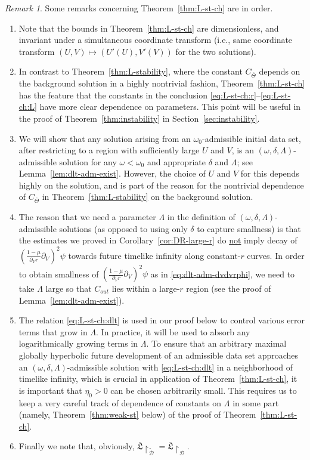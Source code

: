 \documentclass[10pt, reqno]{amsart}
\theoremstyle{definition}
\theoremstyle{remark}
\newtheorem{remark}[theorem]{Remark}
\theoremstyle{conjecture}
\numberwithin{equation}{section}
\newcommand{\rd}{\partial}
\newcommand{\0}{\emptyset}
\newcommand{\dlt}{\delta}
\newcommand{\Lmb}{\Lambda}
\newcommand{\Tht}{\Theta}
\newcommand{\omg}{\omega}
\newcommand{\calD}{\mathcal D}
\newcommand{\f}{\frac}
\begin{document}
\begin{remark} \label{rem:L-stability-char}
Some remarks concerning Theorem~\ref{thm:L-st-ch} are in order.
\begin{enumerate}
\item Note that the bounds in Theorem~\ref{thm:L-st-ch} are dimensionless, and invariant under a simultaneous coordinate transform (i.e., same coordinate transform $(U, V) \mapsto (U'(U), V'(V))$ for the two solutions).
\item In contrast to Theorem~\ref{thm:L-stability}, where the constant $C_{\overline{\Tht}}$ depends on the background solution in a highly nontrivial fashion, Theorem~\ref{thm:L-st-ch} has the feature that the constants in the conclusion \eqref{eq:L-st-ch:r}--\eqref{eq:L-st-ch:L} have more clear dependence on parameters. This point will be useful in the proof of Theorem~\ref{thm:instability} in Section~\ref{sec:instability}.
\item We will show that any solution arising from an $\omg_0$-admissible initial data set, after restricting to a region with sufficiently large $U$ and $V$, is an $(\omg, \dlt, \Lmb)$-admissible solution for any $\omg<\omg_0$ and appropriate $\dlt$ and $\Lmb$; see Lemma~\ref{lem:dlt-adm-exist}. However, the choice of $U$ and $V$ for this depends highly on the solution, and is part of the reason for the nontrivial dependence of $C_{\overline{\Tht}}$ in Theorem~\ref{thm:L-stability} on the background solution.

\item The reason that we need a parameter $\Lmb$ in the definition of $(\omg, \dlt, \Lmb)$-admissible solutions (as opposed to using only $\dlt$ to capture smallness) is that the estimates we proved in Corollary~\ref{cor:DR-large-r} do \underline{not} imply decay of $\left(\f{1-\mu}{\rd_V r} \rd_V\right)^2 \psi$ towards future timelike infinity along constant-$r$ curves. In order to obtain smallness of $\left(\f{1-\mu}{\rd_V r} \rd_V\right)^2 \psi$ as in \eqref{eq:dlt-adm-dvdvrphi}, we need to take $\Lambda$ large so that $C_{out}$ lies within a large-$r$ region (see the proof of Lemma~\ref{lem:dlt-adm-exist}).

\item The relation \eqref{eq:L-st-ch:dlt} is used in our proof below to control various error terms that grow in $\Lmb$. In practice, it will be used to absorb any logarithmically growing terms in $\Lmb$. To ensure that an arbitrary maximal globally hyperbolic future development of an admissible data set approaches an $(\omg, \dlt, \Lmb)$-admissible solution with \eqref{eq:L-st-ch:dlt} in a neighborhood of timelike infinity, which is crucial in application of Theorem~\ref{thm:L-st-ch}, it is important that $\eta_{0} > 0$ can be chosen arbitrarily small.
This requires us to keep a very careful track of dependence of constants on $\Lmb$ in some part (namely, Theorem~\ref{thm:weak-st} below) of the proof of Theorem~\ref{thm:L-st-ch}.
\item Finally we note that, obviously, $\overline{\mathfrak{L}} \restriction_{\widetilde{\calD}} = \overline{\mathfrak{L}} \restriction_{\calD}$. 
\end{enumerate}
\end{remark}
\end{document}
